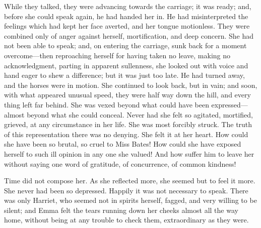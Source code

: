 While they talked, they were advancing towards the carriage; it was ready; and, before she could speak again, he had handed her in. He had misinterpreted the feelings which had kept her face averted, and her tongue motionless. They were combined only of anger against herself, mortification, and deep concern. She had not been able to speak; and, on entering the carriage, sunk back for a moment overcome—then reproaching herself for having taken no leave, making no acknowledgment, parting in apparent sullenness, she looked out with voice and hand eager to shew a difference; but it was just too late. He had turned away, and the horses were in motion. She continued to look back, but in vain; and soon, with what appeared unusual speed, they were half way down the hill, and every thing left far behind. She was vexed beyond what could have been expressed—almost beyond what she could conceal. Never had she felt so agitated, mortified, grieved, at any circumstance in her life. She was most forcibly struck. The truth of this representation there was no denying. She felt it at her heart. How could she have been so brutal, so cruel to Miss Bates! How could she have exposed herself to such ill opinion in any one she valued! And how suffer him to leave her without saying one word of gratitude, of concurrence, of common kindness!

Time did not compose her. As she reflected more, she seemed but to feel it more. She never had been so depressed. Happily it was not necessary to speak. There was only Harriet, who seemed not in spirits herself, fagged, and very willing to be silent; and Emma felt the tears running down her cheeks almost all the way home, without being at any trouble to check them, extraordinary as they were.